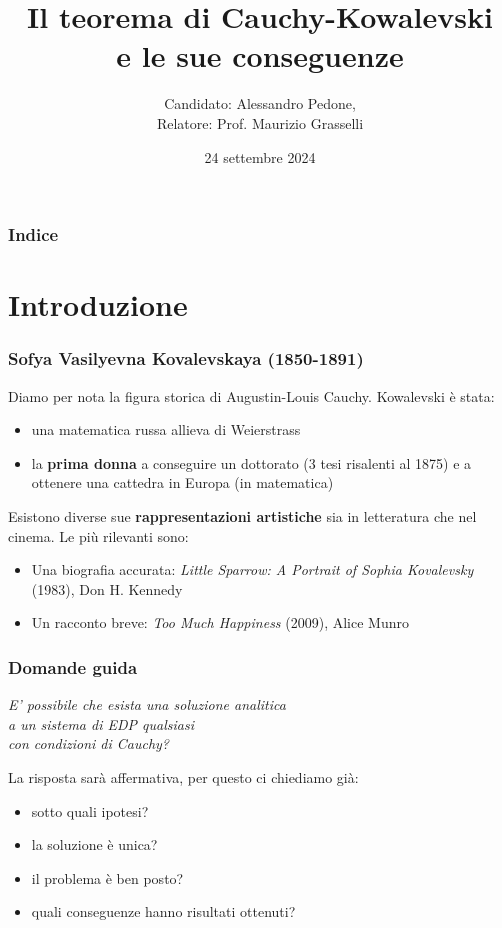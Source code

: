 \documentclass[serif,notheorems]{beamer}
\title{Il teorema di Cauchy-Kowalevski \\ e le sue conseguenze}
\author{Candidato: Alessandro Pedone, \\Relatore: Prof. Maurizio Grasselli}
\institute{Politecnico di Milano}
\date{24 settembre 2024}
\theoremstyle{plain} %
\theoremstyle{definition} %
\theoremstyle{remark}
\begin{document}
\frame{\titlepage}
\begin{frame}
    \frametitle{Indice}
    \tableofcontents
\end{frame}


\section{Introduzione}

\begin{frame}
\frametitle{Sofya Vasilyevna Kovalevskaya (1850-1891)}
Diamo per nota la figura storica di Augustin-Louis Cauchy. 
Kowalevski è stata:
\begin{itemize}
\item una matematica russa allieva di Weierstrass
\item la \textbf{prima donna} a conseguire un dottorato (3 tesi risalenti al 1875) e a ottenere una cattedra in Europa (in matematica)
\end{itemize}
\end{frame}

\begin{frame}
Esistono diverse sue \textbf{rappresentazioni artistiche} sia in letteratura che nel cinema. Le più rilevanti sono:
\begin{itemize}
\item Una biografia accurata: \textit{Little Sparrow: A Portrait of Sophia Kovalevsky} (1983), Don H. Kennedy
\item Un racconto breve: \textit{Too Much Happiness} (2009), Alice Munro
\end{itemize}
\end{frame}


\begin{frame}
\frametitle{Domande guida}
\begin{center}
\textit{E' possibile che esista una soluzione analitica \\ a un sistema di EDP qualsiasi \\ con condizioni di Cauchy?}
\end{center}
\end{frame}

\begin{frame}
La risposta sarà affermativa, per questo ci chiediamo già: 
\begin{itemize}
\item sotto quali ipotesi?
\item la soluzione è unica?
\item il problema è ben posto?
\item quali conseguenze hanno risultati ottenuti?
\end{itemize}
\end{frame}
\end{document}
